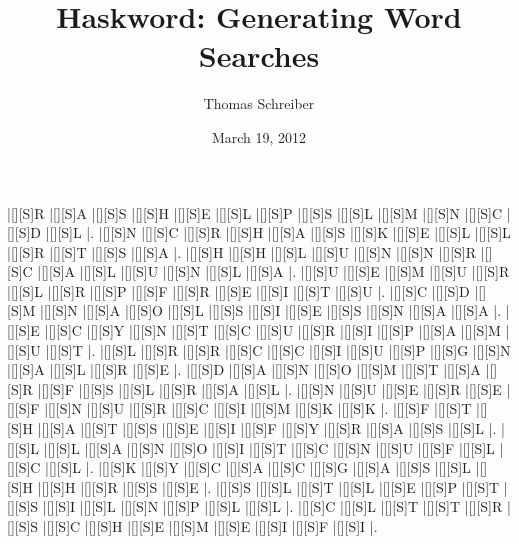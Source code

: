 \documentclass[12pt]{report}   %
\begin{document}
\title{Haskword: Generating Word Searches}   %
\author{Thomas Schreiber}         %
\date{March 19, 2012}    %

\begin{minipage}[h]{\textwidth}
  \maketitle

  \vspace{12pt}

  \begin{Puzzle}{14}{14}%
        |[][S]R |[][S]A |[][S]S |[][S]H |[][S]E |[][S]L |[][S]P |[][S]S |[][S]L |[][S]M |[][S]N |[][S]C |[][S]D |[][S]L |.
        |[][S]N |[][S]C |[][S]R |[][S]H |[][S]A |[][S]S |[][S]K |[][S]E |[][S]L |[][S]L |[][S]R |[][S]T |[][S]S |[][S]A |.
        |[][S]H |[][S]H |[][S]L |[][S]U |[][S]N |[][S]N |[][S]R |[][S]C |[][S]A |[][S]L |[][S]U |[][S]N |[][S]L |[][S]A |.
        |[][S]U |[][S]E |[][S]M |[][S]U |[][S]R |[][S]L |[][S]R |[][S]P |[][S]F |[][S]R |[][S]E |[][S]I |[][S]T |[][S]U |.
        |[][S]C |[][S]D |[][S]M |[][S]N |[][S]A |[][S]O |[][S]L |[][S]S |[][S]I |[][S]E |[][S]S |[][S]N |[][S]A |[][S]A |.
        |[][S]E |[][S]C |[][S]Y |[][S]N |[][S]T |[][S]C |[][S]U |[][S]R |[][S]I |[][S]P |[][S]A |[][S]M |[][S]U |[][S]T |.
        |[][S]L |[][S]R |[][S]R |[][S]C |[][S]C |[][S]I |[][S]U |[][S]P |[][S]G |[][S]N |[][S]A |[][S]L |[][S]R |[][S]E |.
        |[][S]D |[][S]A |[][S]N |[][S]O |[][S]M |[][S]T |[][S]A |[][S]R |[][S]F |[][S]S |[][S]L |[][S]R |[][S]A |[][S]L |.
        |[][S]N |[][S]U |[][S]E |[][S]R |[][S]E |[][S]F |[][S]N |[][S]U |[][S]R |[][S]C |[][S]I |[][S]M |[][S]K |[][S]K |.
        |[][S]F |[][S]T |[][S]H |[][S]A |[][S]T |[][S]S |[][S]E |[][S]I |[][S]F |[][S]Y |[][S]R |[][S]A |[][S]S |[][S]L |.
        |[][S]L |[][S]L |[][S]A |[][S]N |[][S]O |[][S]I |[][S]T |[][S]C |[][S]N |[][S]U |[][S]F |[][S]L |[][S]C |[][S]L |.
        |[][S]K |[][S]Y |[][S]C |[][S]A |[][S]C |[][S]G |[][S]A |[][S]S |[][S]L |[][S]H |[][S]H |[][S]R |[][S]S |[][S]E |.
        |[][S]S |[][S]L |[][S]T |[][S]L |[][S]E |[][S]P |[][S]T |[][S]S |[][S]I |[][S]L |[][S]N |[][S]P |[][S]L |[][S]L |.
        |[][S]C |[][S]L |[][S]T |[][S]T |[][S]R |[][S]S |[][S]C |[][S]H |[][S]E |[][S]M |[][S]E |[][S]I |[][S]F |[][S]I |.
  \end{Puzzle}
\end{minipage}
\end{document}

